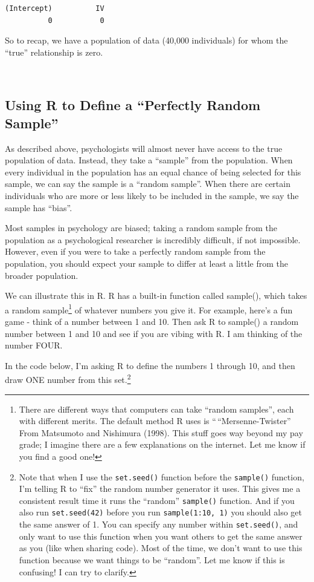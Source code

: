 \documentclass[
  letterpaper,
  DIV=11,
  numbers=noendperiod,
  oneside]{scrreprt}
\begin{document}
\begin{verbatim}
(Intercept)          IV 
          0           0 
\end{verbatim}

\hfill\break
So to recap, we have a population of data (40,000 individuals) for whom
the ``true'' relationship is zero.\\
\strut \\

\subsection{Using R to Define a ``Perfectly Random
Sample''}\label{using-r-to-define-a-perfectly-random-sample}

As described above, psychologists will almost never have access to the
true population of data. Instead, they take a ``sample'' from the
population. When every individual in the population has an equal chance
of being selected for this sample, we can say the sample is a ``random
sample''. When there are certain individuals who are more or less likely
to be included in the sample, we say the sample has ``bias''.

Most samples in psychology are biased; taking a random sample from the
population as a psychological researcher is incredibly difficult, if not
impossible. However, even if you were to take a perfectly random sample
from the population, you should expect your sample to differ at least a
little from the broader population.

We can illustrate this in R. R has a built-in function called sample(),
which takes a random sample\footnote{There are different ways that
  computers can take ``random samples'', each with different merits. The
  default method R uses is ``\,``Mersenne-Twister'' From Matsumoto and
  Nishimura (1998). This stuff goes way beyond my pay grade; I imagine
  there are a few explanations on the internet. Let me know if you find
  a good one!

  \hfill\break
} of whatever numbers you give it. For example, here's a fun game -
think of a number between 1 and 10. Then ask R to sample() a random
number between 1 and 10 and see if you are vibing with R. I am thinking
of the number FOUR.

In the code below, I'm asking R to define the numbers 1 through 10, and
then draw ONE number from this set.\footnote{Note that when I use the
  \texttt{set.seed()} function before the \texttt{sample()} function,
  I'm telling R to ``fix'' the random number generator it uses. This
  gives me a consistent result time it runs the ``random''
  \texttt{sample()} function. And if you also run \texttt{set.seed(42)}
  before you run \texttt{sample(1:10,\ 1)} you should also get the same
  answer of 1. You can specify any number within \texttt{set.seed()},
  and only want to use this function when you want others to get the
  same answer as you (like when sharing code). Most of the time, we
  don't want to use this function because we want things to be
  ``random''. Let me know if this is confusing! I can try to clarify.}
\end{document}
